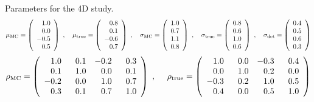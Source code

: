 \noindent
Parameters for the 4D study. 
\[
\mu_{\rm MC} = 
\left(
\begin{array}{r}
1.0 \\ 0.0 \\ -0.5 \\ 0.5 \\ 
\end{array}
\right) \ ,
\ \ \
\mu_{\rm true} = 
\left(
\begin{array}{r}
0.8 \\ 0.1 \\ -0.6 \\ 0.7  \\
\end{array}
\right) \ ,
\ \ \
\sigma_{\rm MC} =
\left(
\begin{array}{r}
1.0 \\ 0.7 \\ 1.1 \\ 0.8 \\ 
\end{array}
\right) \ ,
\ \ \
\sigma_{\rm true} =
\left(
\begin{array}{r}
0.8 \\ 0.6 \\ 1.0 \\ 0.6 \\ 
\end{array}
\right) \ ,
\ \ \ 
\sigma_{\rm det} = 
\left(
\begin{array}{r}
0.4 \\ 0.5 \\ 0.6 \\ 0.3 \\ 
\end{array}
\right)
\]
%
\[
  \rho_{\rm MC} =
  \left(
  \begin{array}{rrrr}
    1.0 & 0.1 & -0.2 & 0.3  \\
    0.1 & 1.0 & 0.0 & 0.1  \\
    -0.2 & 0.0 & 1.0 & 0.7   \\
    0.3 & \ \ 0.1 & 0.7 & \ \ 1.0  \\
  \end{array}
  \right) \ ,
\ \ \ \
  \rho_{\rm true} =
  \left(
  \begin{array}{rrrr}
    1.0 & 0.0 & -0.3 & 0.4  \\
    0.0 & 1.0 & 0.2 & 0.0  \\
    -0.3 & 0.2 & 1.0 & 0.5  \\
    0.4 & \ \ 0.0 & 0.5 & \ \ 1.0  \\ 
  \end{array}
  \right)
\]

